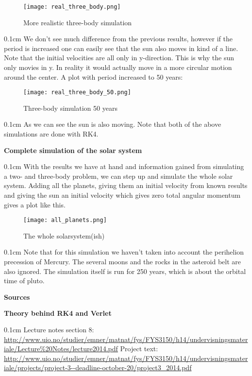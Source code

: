 \documentclass[11 pt, a4 paper]{article}
\newenvironment{tabbed}{\begin{addmargin}{0.1cm}}{\end{addmargin}}
\newcommand{\sectiontitle}[1]{\begin{center} \Large\textbf{{#1}} \end{center}}
\newcommand{\sectionundertitle}[1]{\hspace{-0.5cm} \textbf{{#1}}}
\begin{document}
        \begin{figure}[H]
            \centering
            \texttt{[image: real\_three\_body.png]}
            \caption{More realistic three-body simulation}
        \end{figure}
    \begin{tabbed}
        We don't see much difference from the previous results, however if the period is increased one can easily see that the sun also moves in kind of a line. Note that the initial velocities are all only in y-direction. This is why the sun only movies in y. In reality it would actually move in a more circular motion around the center. A plot with period increased to 50 years:
    \end{tabbed}
        \begin{figure}[H]
            \centering
            \texttt{[image: real\_three\_body\_50.png]}
            \caption{Three-body simulation 50 years}
        \end{figure}
    \begin{tabbed}
        As we can see the sun is also moving. Note that both of the above simulations are done with RK4.
    \end{tabbed}
\sectiontitle{Complete simulation of the solar system}
    \begin{tabbed}
        With the results we have at hand and information gained from simulating a two- and three-body problem, we can step up and simulate the whole solar system. Adding all the planets, giving them an initial velocity from known results and giving the sun an initial velocity which gives zero total angular momentum gives a plot like this.
    \end{tabbed}
    \begin{figure}[H]
        \centering
        \texttt{[image: all\_planets.png]}
        \caption{The whole solarsystem(ish)}
    \end{figure}
    \begin{tabbed}
        Note that for this simulation we haven't taken into account the perihelion precession of Mercury. The several moons and the rocks in the asteroid belt are also ignored. The simulation itself is run for 250 years, which is about the orbital time of pluto.
    \end{tabbed}
\sectiontitle{Sources}
\sectionundertitle{Theory behind RK4 and Verlet}
    \begin{tabbed}
        Lecture notes section 8:\\
        \url{http://www.uio.no/studier/emner/matnat/fys/FYS3150/h14/undervisningsmateriale/Lecture\%20Notes/lecture2014.pdf}
        Project text:\\
        \url{http://www.uio.no/studier/emner/matnat/fys/FYS3150/h14/undervisningsmateriale/projects/project-3--deadline-october-20/project3_2014.pdf}
    \end{tabbed}
\end{document}
